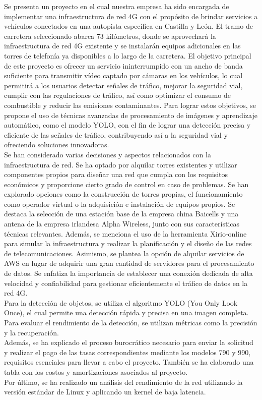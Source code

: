 Se presenta un proyecto en el cual nuestra empresa ha sido encargada de implementar una infraestructura de red 4G con el propósito de brindar servicios a vehículos conectados en una autopista específica en Castilla y León. El tramo de carretera seleccionado abarca 73 kilómetros, donde se aprovechará la infraestructura de red 4G existente y se instalarán equipos adicionales en las torres de telefonía ya disponibles a lo largo de la carretera. El objetivo principal de este proyecto es ofrecer un servicio ininterrumpido con un ancho de banda suficiente para transmitir vídeo captado por cámaras en los vehículos, lo cual permitirá a los usuarios detectar señales de tráfico, mejorar la seguridad vial, cumplir con las regulaciones de tráfico, así como optimizar el consumo de combustible y reducir las emisiones contaminantes. Para lograr estos objetivos, se propone el uso de técnicas avanzadas de procesamiento de imágenes y aprendizaje automático, como el modelo YOLO, con el fin de lograr una detección precisa y eficiente de las señales de tráfico, contribuyendo así a la seguridad vial y ofreciendo soluciones innovadoras.\\

Se han considerado varias decisiones y aspectos relacionados con la infraestructura de red. Se ha optado por alquilar torres existentes y utilizar componentes propios para diseñar una red que cumpla con los requisitos económicos y proporcione cierto grado de control en caso de problemas. Se han explorado opciones como la construcción de torres propias, el funcionamiento como operador virtual o la adquisición e instalación de equipos propios. Se destaca la selección de una estación base de la empresa china Baicells y una antena de la empresa irlandesa Alpha Wireless, junto con sus características técnicas relevantes. Además, se menciona el uso de la herramienta Xirio-online para simular la infraestructura y realizar la planificación y el diseño de las redes de telecomunicaciones. Asimismo, se plantea la opción de alquilar servicios de AWS en lugar de adquirir una gran cantidad de servidores para el procesamiento de datos. Se enfatiza la importancia de establecer una conexión dedicada de alta velocidad y confiabilidad para gestionar eficientemente el tráfico de datos en la red 4G.\\

Para la detección de objetos, se utiliza el algoritmo YOLO (You Only Look Once), el cual permite una detección rápida y precisa en una imagen completa. Para evaluar el rendimiento de la detección, se utilizan métricas como la precisión y la recuperación.\\

Además, se ha explicado el proceso burocrático necesario para enviar la solicitud y realizar el pago de las tasas correspondientes mediante los modelos 790 y 990, requisitos esenciales para llevar a cabo el proyecto. También se ha elaborado una tabla con los costos y amortizaciones asociados al proyecto.\\

Por último, se ha realizado un análisis del rendimiento de la red utilizando la versión estándar de Linux y aplicando un kernel de baja latencia.